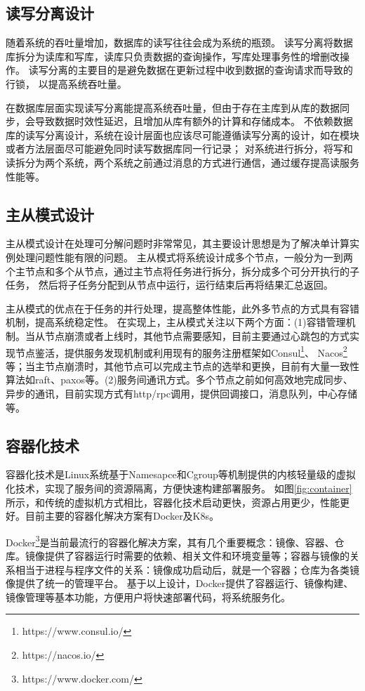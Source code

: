 \subsection{读写分离设计}
随着系统的吞吐量增加，数据库的读写往往会成为系统的瓶颈。
读写分离将数据库拆分为读库和写库，读库只负责数据的查询操作，写库处理事务性的增删改操作。
读写分离的主要目的是避免数据在更新过程中收到数据的查询请求而导致的行锁，
以提高系统吞吐量。

在数据库层面实现读写分离能提高系统吞吐量，但由于存在主库到从库的数据同步，会导致数据时效性延迟，且增加从库有额外的计算和存储成本。
不依赖数据库的读写分离设计，系统在设计层面也应该尽可能遵循读写分离的设计，如在模块或者方法层面尽可能避免同时读写数据库同一行记录；
对系统进行拆分，将写和读拆分为两个系统，两个系统之前通过消息的方式进行通信，通过缓存提高读服务性能等。

\subsection{主从模式设计}
主从模式设计在处理可分解问题时非常常见，其主要设计思想是为了解决单计算实例处理问题性能有限的问题。
主从模式将系统设计成多个节点，一般分为一到两个主节点和多个从节点，通过主节点将任务进行拆分，拆分成多个可分开执行的子任务，
然后将子任务分配到从节点中运行，运行结束后再将结果汇总返回。

主从模式的优点在于任务的并行处理，提高整体性能，此外多节点的方式具有容错机制，提高系统稳定性。
在实现上，主从模式关注以下两个方面：(1)容错管理机制。当从节点崩溃或者上线时，其他节点需要感知，目前主要通过心跳包的方式实现节点鉴活，提供服务发现机制或利用现有的服务注册框架如Consul\footnote{https://www.consul.io/}、 Nacos\footnote{https://nacos.io/}等；当主节点崩溃时，其他节点可以完成主节点的选举和更换，目前有大量一致性算法如raft、paxos等。(2)服务间通讯方式。多个节点之前如何高效地完成同步、异步的通讯，目前实现方式有http/rpc调用，提供回调接口，消息队列，中心存储等。

\subsection{容器化技术}
容器化技术是Linux系统基于Namesapce和Cgroup等机制提供的内核轻量级的虚拟化技术，实现了服务间的资源隔离，方便快速构建部署服务。
如图\ref{fig:container}所示，和传统的虚拟机方式相比，容器化技术启动更快，资源占用更少，性能更好。目前主要的容器化解决方案有Docker及K8s。

Docker\footnote{https://www.docker.com/}是当前最流行的容器化解决方案，其有几个重要概念：镜像、容器、仓库。镜像提供了容器运行时需要的依赖、相关文件和环境变量等；容器与镜像的关系相当于进程与程序文件的关系：镜像成功启动后，就是一个容器；仓库为各类镜像提供了统一的管理平台。
基于以上设计，Docker提供了容器运行、镜像构建、镜像管理等基本功能，方便用户将快速部署代码，将系统服务化。

